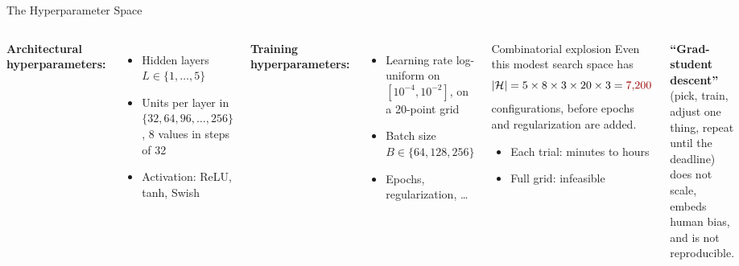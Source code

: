\documentclass[aspectratio=169,11pt]{beamer}
\newcommand{\emphc}[1]{\textcolor{harvardcrimson}{#1}}
\begin{document}
\begin{frame}{The Hyperparameter Space}
\begin{columns}[T]
\textbf{Architectural hyperparameters:}
\begin{itemize}
    \item Hidden layers $L \in \{1, \ldots, 5\}$
    \item Units per layer in $\{32, 64, 96, \ldots, 256\}$, 8 values in steps of 32
    \item Activation: ReLU, tanh, Swish
\end{itemize}

\vspace{0.3cm}
\textbf{Training hyperparameters:}
\begin{itemize}
    \item Learning rate log-uniform on $[10^{-4}, 10^{-2}]$, on a 20-point grid
    \item Batch size $B \in \{64, 128, 256\}$
    \item Epochs, regularization, \ldots
\end{itemize}

\begin{block}{Combinatorial explosion}
Even this modest search space has
\[
    |\mathcal{H}| = 5 \times 8 \times 3 \times 20 \times 3 = \emphc{7{,}200}
\]
configurations, before epochs and regularization are added.
\begin{itemize}
    \item Each trial: minutes to hours
    \item Full grid: \emphc{infeasible}
\end{itemize}
\end{block}

\vspace{0.3cm}
{\footnotesize \textbf{``Grad-student descent''} (pick, train, adjust one thing, repeat until the deadline) \emphc{does not scale}, embeds human bias, and is not reproducible.}
\end{columns}
\end{frame}
\end{document}
